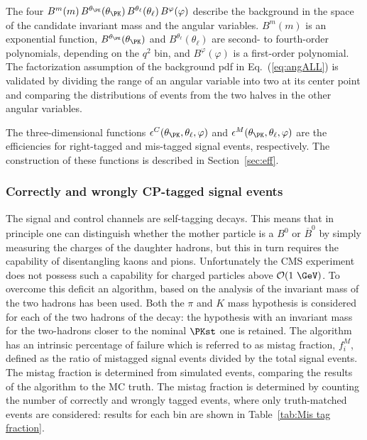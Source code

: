 The four \pdfs $B^m(m) \, B^{\theta_\PK}(\theta_\PK) \, B^{\theta_\ell}(\theta_\ell) \, B^{\varphi}(\varphi)$ describe the background in the space of the \PBz candidate invariant mass and the angular variables.
$B^m(m)$ is an exponential function, $B^{\theta_\PK}(\theta_\PK)$ and $B^{\theta_\ell}(\theta_\ell)$ are second- to fourth-order polynomials, depending on the $q^2$ bin, and $B^{\varphi}(\varphi)$ is a first-order polynomial.
The factorization assumption of the background pdf in Eq.~(\ref{eq:angALL}) is validated by dividing the range of an angular variable into two at its center point and comparing the distributions of events from the two halves in the other angular variables.

The three-dimensional functions $\epsilon^{C}(\theta_\PK,\theta_\ell,\varphi)$ and $\epsilon^{M}(\theta_\PK,\theta_\ell,\varphi)$ are the efficiencies for right-tagged and mis-tagged signal events, respectively.
The construction of these functions is described in Section~\ref{sec:eff}.


\subsubsection{Correctly and wrongly CP-tagged signal events}
\label{sec:fullform}

The signal and control channels are self-tagging decays.
This means that in principle one can distinguish whether the mother particle is a $B^0$ or $\overline{B}^0$ by simply measuring the charges of the daughter hadrons, but this in turn requires the capability of disentangling kaons and pions.
Unfortunately the CMS experiment does not possess such a capability for charged particles above $\mathcal{O}(1~\GeV)$.
To overcome this deficit an algorithm, based on the analysis of the invariant mass of the two hadrons has been used.
Both the $\pi$ and $K$ mass hypothesis is considered for each of the two hadrons of the decay: the hypothesis with an invariant mass for the two-hadrons closer to the nominal $\PKst$ one is retained.
The algorithm has an intrinsic percentage of failure which is referred to as mistag fraction, $f^M_i$, defined as the ratio of mistagged signal events divided by the total signal events.
The mistag fraction is determined from simulated events, comparing the results of the algorithm to the MC truth.
The mistag fraction is determined by counting the number of correctly and wrongly tagged events, where only truth-matched events are considered: results for each bin are shown in Table~\ref{tab:Mis tag fraction}.

